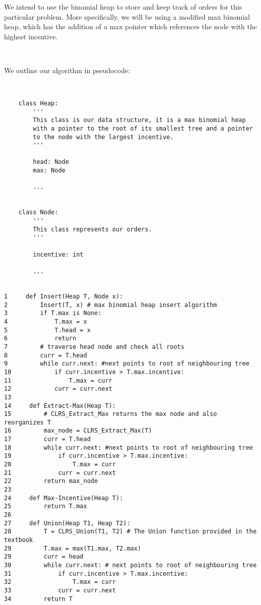 \documentclass[20pt]{article}
\begin{document}
\noindent
\begin{text}
    We intend to use the binomial heap to store and keep track of orders for this particular problem. More specifically, we will be using a modified max binomial heap, which has the addition of a max pointer which references the node with the highest incentive. 
\end{text}
\\

\noindent
\begin{text}
    We outline our algorithm in pseudocode:
    
\end{text}
\begin{lstlisting}
    
    
    class Heap:
        '''
        This class is our data structure, it is a max binomial heap 
        with a pointer to the root of its smallest tree and a pointer
        to the node with the largest incentive.
        '''
        
        head: Node
        max: Node
        
        ...
    
    
    class Node:
        '''
        This class represents our orders.
        '''
        
        incentive: int        
        
        ...


1     def Insert(Heap T, Node x):
2         Insert(T, x) # max binomial heap insert algorithm
3         if T.max is None:
4             T.max = x
5             T.head = x
6             return
7         # traverse head node and check all roots
8         curr = T.head
9         while curr.next: #next points to root of neighbouring tree
10            if curr.incentive > T.max.incentive:
11                T.max = curr
12            curr = curr.next
13    
14     def Extract-Max(Heap T):
15         # CLRS_Extract_Max returns the max node and also reorganizes T
16         max_node = CLRS_Extract_Max(T)
17         curr = T.head
18         while curr.next: #next points to root of neighbouring tree
19             if curr.incentive > T.max.incentive:
20                 T.max = curr
21             curr = curr.next
22         return max_node
23        
24     def Max-Incentive(Heap T):
25         return T.max
26        
27     def Union(Heap T1, Heap T2):
28         T = CLRS_Union(T1, T2) # The Union function provided in the textbook
29         T.max = max(T1.max, T2.max)
29         curr = head
30         while curr.next: # next points to root of neighbouring tree
31             if curr.incentive > T.max.incentive:
32                 T.max = curr
33             curr = curr.next
34         return T

\end{lstlisting}
\end{document}
